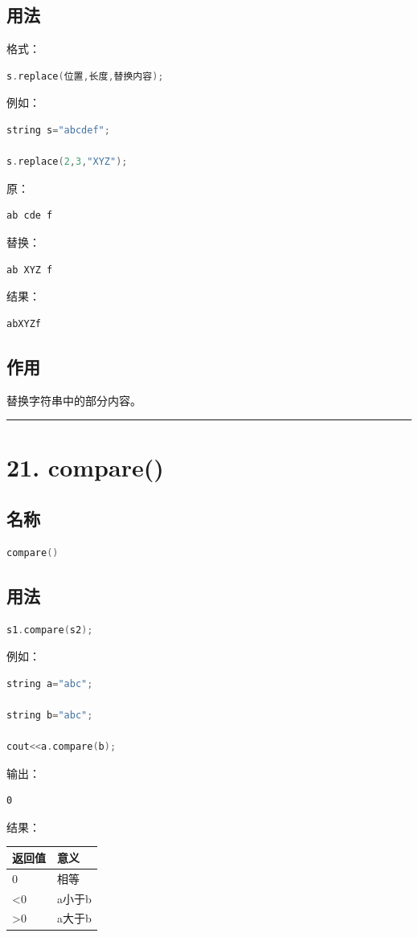 \documentclass[10pt,twocolumn]{extarticle}
\begin{document}
\subsection{用法}
格式：
\begin{lstlisting}[language=C++]
s.replace(位置,长度,替换内容);
\end{lstlisting}
例如：
\begin{lstlisting}[language=C++]
string s="abcdef";

s.replace(2,3,"XYZ");
\end{lstlisting}
原：
\begin{lstlisting}
ab cde f
\end{lstlisting}
替换：
\begin{lstlisting}
ab XYZ f
\end{lstlisting}
结果：
\begin{lstlisting}
abXYZf
\end{lstlisting}

\subsection{作用}
替换字符串中的部分内容。

\noindent\rule{\linewidth}{0.4pt}

\section{21. compare()}

\subsection{名称}
\begin{lstlisting}[language=C++]
compare()
\end{lstlisting}

\subsection{用法}
\begin{lstlisting}[language=C++]
s1.compare(s2);
\end{lstlisting}
例如：
\begin{lstlisting}[language=C++]
string a="abc";

string b="abc";

cout<<a.compare(b);
\end{lstlisting}
输出：
\begin{lstlisting}
0
\end{lstlisting}
结果：
\begin{table}[h]
\centering
\begin{tabular}{|l|l|}
\hline
返回值 & 意义 \\ \hline
0 & 相等 \\ \hline
<0 & a小于b \\ \hline
>0 & a大于b \\ \hline
\end{tabular}
\end{table}
\end{document}
